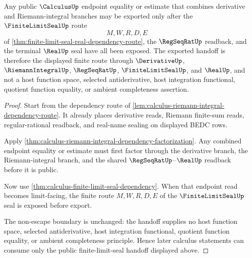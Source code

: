 \begin{theorem}
\label{thm:calculus-finite-limit-seal-public-handoff}
Any public $\CalculusUp$ endpoint equality or estimate that combines derivative and Riemann-integral branches may be exported only after the $\FiniteLimitSealUp$ route
$$
M,W,R,D,E
$$
of \autoref{thm:finite-limit-seal-real-dependency-route}, the $\RegSeqRatUp$ readback, and the terminal $\RealUp$ seal have all been exposed. The exported handoff is therefore the displayed finite route through $\DerivativeUp$, $\RiemannIntegralUp$, $\RegSeqRatUp$, $\FiniteLimitSealUp$, and $\RealUp$, and not a host function space, selected antiderivative, host integration functional, quotient function equality, or ambient completeness assertion.
\end{theorem}
\begin{proof}
Start from the dependency route of \autoref{lem:calculus-riemann-integral-dependency-route}. It already places derivative reads, Riemann finite-sum reads, regular-rational readback, and real-name sealing on displayed BEDC rows.

Apply \autoref{thm:calculus-riemann-integral-dependency-factorization}. Any combined endpoint equality or estimate must first factor through the derivative branch, the Riemann-integral branch, and the shared $\RegSeqRatUp$--$\RealUp$ readback before it is public.

Now use \autoref{thm:calculus-finite-limit-seal-dependency}. When that endpoint read becomes limit-facing, the finite route $M,W,R,D,E$ of the $\FiniteLimitSealUp$ seal is exposed before export.

The non-escape boundary is unchanged: the handoff supplies no host function space, selected antiderivative, host integration functional, quotient function equality, or ambient completeness principle. Hence later calculus statements can consume only the public finite-limit-seal handoff displayed above.
\end{proof}
